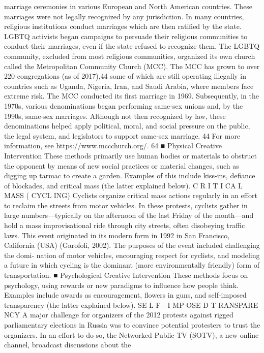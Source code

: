 \documentclass[twoside,a4paper,12pt,fleqn,openany]{extbook}
\begin{document}
marriage ceremonies in various European and North American countries. These marriages
were not legally recognized by any jurisdiction.
In many countries, religious institutions conduct marriages which are then ratified by the
state. LGBTQ activists began campaigns to persuade their religious communities to conduct
their marriages, even if the state refused to recognize them. The LGBTQ community, excluded
from most religious communities, organized its own church called the Metropolitan Community
Church (MCC). The MCC has grown to over 220 congregations (as of 2017),44 some of which
are still operating illegally in countries such as Uganda, Nigeria, Iran, and Saudi Arabia, where
members face extreme risk. The MCC conducted its first marriage in 1969. Subsequently, in
the 1970s, various denominations began performing same-sex unions and, by the 1990s,
same-sex marriages. Although not then recognized by law, these denominations helped
apply political, moral, and social pressure on the public, the legal system, and legislators to
support same-sex marriage.
44
For more information, see https://www.mccchurch.org/.
64
■ Physical Creative Intervention
These methods primarily use human bodies or materials to obstruct the opponent by means of
new social practices or material changes, such as digging up tarmac to create a garden. Examples
of this include kiss-ins, defiance of blockades, and critical mass (the latter explained below).
C R I T I CA L MASS ( CYCL ING)
Cyclists organize critical mass actions regularly in an effort to reclaim the streets from motor
vehicles. In these protests, cyclists gather in large numbers—typically on the afternoon of the
last Friday of the month—and hold a mass improvisational ride through city streets, often
disobeying traffic laws. This event originated in its modern form in 1992 in San Francisco,
California (USA) (Garofoli, 2002). The purposes of the event included challenging the domi-
nation of motor vehicles, encouraging respect for cyclists, and modeling a future in which
cycling is the dominant (more environmentally friendly) form of transportation.
■ Psychological Creative Intervention
These methods focus on psychology, using rewards or new paradigms to influence how
people think. Examples include awards as encouragement, flowers in guns, and self-imposed
transparency (the latter explained below).
SE L F - I MP OSE D T RANSPARE NCY
A major challenge for organizers of the 2012 protests against rigged parliamentary elections
in Russia was to convince potential protesters to trust the organizers. In an effort to do so,
the Networked Public TV (SOTV), a new online channel, broadcast discussions about the
\end{document}
